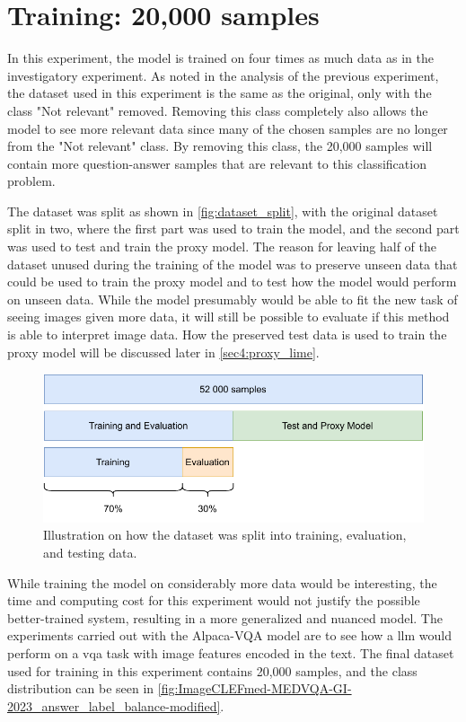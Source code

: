     \section{Training: 20,000 samples}

    In this experiment, the model is trained on four times as much data as in the investigatory experiment. 
    As noted in the analysis of the previous experiment, the dataset used in this experiment is the same as the original, only with the class "Not relevant" removed.
    Removing this class completely also allows the model to see more relevant data since many of the chosen samples are no longer from the "Not relevant" class. 
    By removing this class, the 20,000 samples will contain more question-answer samples that are relevant to this classification problem. 
    
    The dataset was split as shown in \autoref{fig:dataset_split}, with the original dataset split in two, where the first part was used to train the model, and the second part was used to test and train the proxy model. The reason for leaving half of the dataset unused during the training of the model was to preserve unseen data that could be used to train the proxy model and to test how the model would perform on unseen data. While the model presumably would be able to fit the new task of seeing images given more data, it will still be possible to evaluate if this method is able to interpret image data. How the preserved test data is used to train the proxy model will be discussed later in \autoref{sec4:proxy_lime}.


    \begin{figure}[htb]
        \centerline{
        \includegraphics[width=\textwidth]{images/datatset_split.pdf}}
        \caption{Illustration on how the dataset was split into training, evaluation, and testing data.}
        \label{fig:dataset_split}
    \end{figure} 
    
    While training the model on considerably more data would be interesting, the time and computing cost for this experiment would not justify the possible better-trained system, resulting in a more generalized and nuanced model. The experiments carried out with the Alpaca-VQA model are to see how a \gls{llm} would perform on a \gls{vqa} task with image features encoded in the text.
    The final dataset used for training in this experiment contains 20,000 samples, and the class distribution can be seen in \autoref{fig:ImageCLEFmed-MEDVQA-GI-2023_answer_label_balance-modified}.


